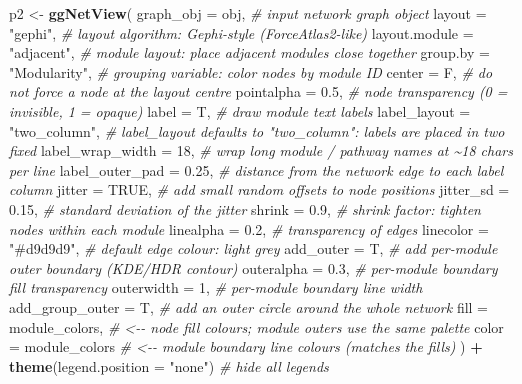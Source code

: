 \documentclass[
]{book}
\newenvironment{Shaded}{\begin{snugshade}}{\end{snugshade}}
\newcommand{\AttributeTok}[1]{\textcolor[rgb]{0.13,0.29,0.53}{#1}}
\newcommand{\CommentTok}[1]{\textcolor[rgb]{0.56,0.35,0.01}{\textit{#1}}}
\newcommand{\ConstantTok}[1]{\textcolor[rgb]{0.56,0.35,0.01}{#1}}
\newcommand{\DecValTok}[1]{\textcolor[rgb]{0.00,0.00,0.81}{#1}}
\newcommand{\FloatTok}[1]{\textcolor[rgb]{0.00,0.00,0.81}{#1}}
\newcommand{\FunctionTok}[1]{\textcolor[rgb]{0.13,0.29,0.53}{\textbf{#1}}}
\newcommand{\NormalTok}[1]{#1}
\newcommand{\OtherTok}[1]{\textcolor[rgb]{0.56,0.35,0.01}{#1}}
\newcommand{\SpecialCharTok}[1]{\textcolor[rgb]{0.81,0.36,0.00}{\textbf{#1}}}
\newcommand{\StringTok}[1]{\textcolor[rgb]{0.31,0.60,0.02}{#1}}
\begin{document}
\begin{Shaded}
\begin{Highlighting}[]
\NormalTok{p2 }\OtherTok{\textless{}{-}} \FunctionTok{ggNetView}\NormalTok{(}
  \AttributeTok{graph\_obj        =}\NormalTok{ obj,             }\CommentTok{\# input network graph object}
  \AttributeTok{layout           =} \StringTok{"gephi"}\NormalTok{,         }\CommentTok{\# layout algorithm: Gephi{-}style (ForceAtlas2{-}like)}
  \AttributeTok{layout.module    =} \StringTok{"adjacent"}\NormalTok{,      }\CommentTok{\# module layout: place adjacent modules close together}
  \AttributeTok{group.by         =} \StringTok{"Modularity"}\NormalTok{,    }\CommentTok{\# grouping variable: color nodes by module ID}
  \AttributeTok{center           =}\NormalTok{ F,               }\CommentTok{\# do not force a node at the layout centre}
  \AttributeTok{pointalpha       =} \FloatTok{0.5}\NormalTok{,             }\CommentTok{\# node transparency (0 = invisible, 1 = opaque)}
  \AttributeTok{label            =}\NormalTok{ T,               }\CommentTok{\# draw module text labels}
  \AttributeTok{label\_layout     =} \StringTok{"two\_column"}\NormalTok{,    }\CommentTok{\# label\_layout defaults to "two\_column": labels are placed in two fixed}
  \AttributeTok{label\_wrap\_width =} \DecValTok{18}\NormalTok{,              }\CommentTok{\# wrap long module / pathway names at \textasciitilde{}18 chars per line}
  \AttributeTok{label\_outer\_pad  =} \FloatTok{0.25}\NormalTok{,            }\CommentTok{\# distance from the network edge to each label column}
  \AttributeTok{jitter           =} \ConstantTok{TRUE}\NormalTok{,            }\CommentTok{\# add small random offsets to node positions}
  \AttributeTok{jitter\_sd        =} \FloatTok{0.15}\NormalTok{,            }\CommentTok{\# standard deviation of the jitter}
  \AttributeTok{shrink           =} \FloatTok{0.9}\NormalTok{,             }\CommentTok{\# shrink factor: tighten nodes within each module}
  \AttributeTok{linealpha        =} \FloatTok{0.2}\NormalTok{,             }\CommentTok{\# transparency of edges}
  \AttributeTok{linecolor        =} \StringTok{"\#d9d9d9"}\NormalTok{,       }\CommentTok{\# default edge colour: light grey}
  \AttributeTok{add\_outer        =}\NormalTok{ T,               }\CommentTok{\# add per{-}module outer boundary (KDE/HDR contour)}
  \AttributeTok{outeralpha       =} \FloatTok{0.3}\NormalTok{,             }\CommentTok{\# per{-}module boundary fill transparency}
  \AttributeTok{outerwidth       =} \DecValTok{1}\NormalTok{,               }\CommentTok{\# per{-}module boundary line width}
  \AttributeTok{add\_group\_outer  =}\NormalTok{ T,               }\CommentTok{\# add an outer circle around the whole network}
  \AttributeTok{fill             =}\NormalTok{ module\_colors,   }\CommentTok{\# \textless{}{-}{-} node fill colours; module outers use the same palette}
  \AttributeTok{color            =}\NormalTok{ module\_colors    }\CommentTok{\# \textless{}{-}{-} module boundary line colours (matches the fills)}
\NormalTok{) }\SpecialCharTok{+}
  \FunctionTok{theme}\NormalTok{(}\AttributeTok{legend.position =} \StringTok{"none"}\NormalTok{)     }\CommentTok{\# hide all legends}



\end{Highlighting}
\end{Shaded}
\end{document}
